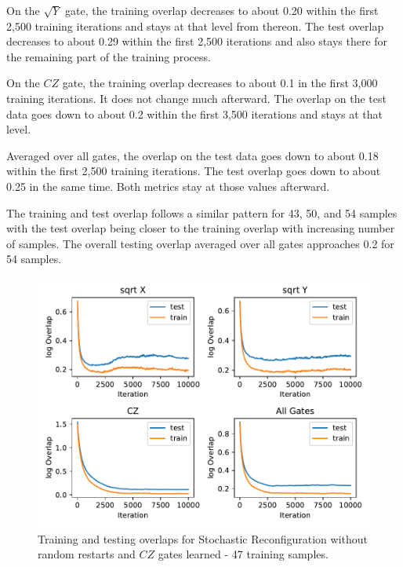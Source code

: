 On the $\sqrt{Y}$ gate, the training overlap decreases to about 0.20 within the first 2,500 training iterations 
and stays at that level from thereon. The test overlap decreases to about 0.29 within the first 2,500 iterations 
and also stays there for the remaining part of the training process.

On the $CZ$ gate, the training overlap decreases to about 0.1 in the first 3,000 training iterations. It does 
not change much afterward. The overlap on the test data goes down to about 0.2 within the first 3,500 iterations 
and stays at that level.

Averaged over all gates, the overlap on the test data goes down to about 0.18 within the first 2,500 training iterations. 
The test overlap goes down to about 0.25 in the same time. Both metrics stay at those values afterward.

The training and test overlap follows a similar pattern for 43, 50, and 54 samples with the 
test overlap being closer to the training overlap with increasing number of samples. The overall
testing overlap averaged over all gates approaches 0.2 for 54 samples.

\begin{figure}[H]
  \centering
  \includegraphics[width=\textwidth]{figures/results/sr-no-restarts-learned/avgOverlap_47.pdf}
  \caption[Training and Testing Overlaps for Stochastic Reconfiguration without Random Restarts and $CZ$ Gates Learned - 47 Samples]{ 
  Training and testing overlaps for Stochastic Reconfiguration without random restarts and $CZ$ gates learned - 47 training samples.}
  \label{fig:sr_no_restarts_overlap_47}
\end{figure}

